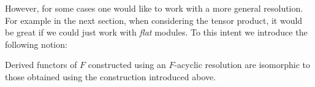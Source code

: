 	However, for some cases one would like to work with a more general resolution. For example in the next section, when considering the tensor product, it would be great if we could just work with \textit{flat} modules. To this intent we introduce the following notion:
    \begin{property}\label{homalg:acyclic_derived_functors}
        Derived functors of $F$ constructed using an $F$-acyclic resolution are isomorphic to those obtained using the construction introduced above.
    \end{property}

